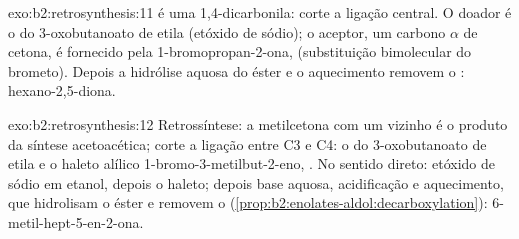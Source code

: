 \begin{solution}{exo:b2:retrosynthesis:11}
 é uma 1,4-dicarbonila: corte a ligação  central. O doador é o 
do 3-oxobutanoato de etila (etóxido de sódio); o aceptor, um carbono $\alpha$ de cetona, é fornecido
pela 1-bromopropan-2-ona,  (substituição bimolecular do brometo). Depois a hidrólise
aquosa do éster e o aquecimento removem o : hexano-2,5-diona.
\end{solution}

\begin{solution}{exo:b2:retrosynthesis:12}
Retrossíntese: a metilcetona com um  vizinho é o produto da síntese acetoacética; corte a
ligação entre C3 e C4: o  do 3-oxobutanoato de etila e o haleto alílico
1-bromo-3-metilbut-2-eno, . No sentido direto: etóxido de sódio em etanol, depois o
haleto; depois base aquosa, acidificação e aquecimento, que hidrolisam o éster e removem o 
(\cref{prop:b2:enolates-aldol:decarboxylation}): 6-metil-hept-5-en-2-ona.
\end{solution}

